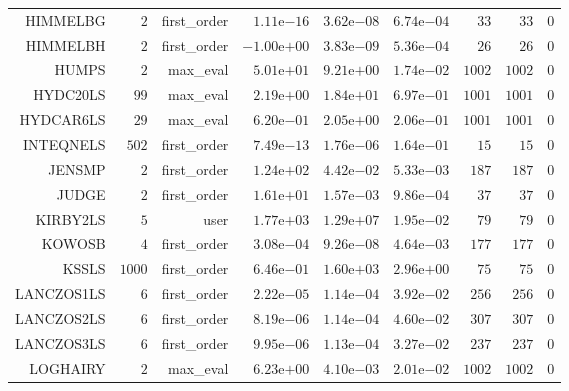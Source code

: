 \begin{longtable}{rrrrrrrrr}
HIMMELBG & \(     2\) & first\_order & \( 1.11\)e\(-16\) & \( 3.62\)e\(-08\) & \( 6.74\)e\(-04\) & \(    33\) & \(    33\) & \(     0\) \\
HIMMELBH & \(     2\) & first\_order & \(-1.00\)e\(+00\) & \( 3.83\)e\(-09\) & \( 5.36\)e\(-04\) & \(    26\) & \(    26\) & \(     0\) \\
HUMPS & \(     2\) & max\_eval & \( 5.01\)e\(+01\) & \( 9.21\)e\(+00\) & \( 1.74\)e\(-02\) & \(  1002\) & \(  1002\) & \(     0\) \\
HYDC20LS & \(    99\) & max\_eval & \( 2.19\)e\(+00\) & \( 1.84\)e\(+01\) & \( 6.97\)e\(-01\) & \(  1001\) & \(  1001\) & \(     0\) \\
HYDCAR6LS & \(    29\) & max\_eval & \( 6.20\)e\(-01\) & \( 2.05\)e\(+00\) & \( 2.06\)e\(-01\) & \(  1001\) & \(  1001\) & \(     0\) \\
INTEQNELS & \(   502\) & first\_order & \( 7.49\)e\(-13\) & \( 1.76\)e\(-06\) & \( 1.64\)e\(-01\) & \(    15\) & \(    15\) & \(     0\) \\
JENSMP & \(     2\) & first\_order & \( 1.24\)e\(+02\) & \( 4.42\)e\(-02\) & \( 5.33\)e\(-03\) & \(   187\) & \(   187\) & \(     0\) \\
JUDGE & \(     2\) & first\_order & \( 1.61\)e\(+01\) & \( 1.57\)e\(-03\) & \( 9.86\)e\(-04\) & \(    37\) & \(    37\) & \(     0\) \\
KIRBY2LS & \(     5\) & user & \( 1.77\)e\(+03\) & \( 1.29\)e\(+07\) & \( 1.95\)e\(-02\) & \(    79\) & \(    79\) & \(     0\) \\
KOWOSB & \(     4\) & first\_order & \( 3.08\)e\(-04\) & \( 9.26\)e\(-08\) & \( 4.64\)e\(-03\) & \(   177\) & \(   177\) & \(     0\) \\
KSSLS & \(  1000\) & first\_order & \( 6.46\)e\(-01\) & \( 1.60\)e\(+03\) & \( 2.96\)e\(+00\) & \(    75\) & \(    75\) & \(     0\) \\
LANCZOS1LS & \(     6\) & first\_order & \( 2.22\)e\(-05\) & \( 1.14\)e\(-04\) & \( 3.92\)e\(-02\) & \(   256\) & \(   256\) & \(     0\) \\
LANCZOS2LS & \(     6\) & first\_order & \( 8.19\)e\(-06\) & \( 1.14\)e\(-04\) & \( 4.60\)e\(-02\) & \(   307\) & \(   307\) & \(     0\) \\
LANCZOS3LS & \(     6\) & first\_order & \( 9.95\)e\(-06\) & \( 1.13\)e\(-04\) & \( 3.27\)e\(-02\) & \(   237\) & \(   237\) & \(     0\) \\
LOGHAIRY & \(     2\) & max\_eval & \( 6.23\)e\(+00\) & \( 4.10\)e\(-03\) & \( 2.01\)e\(-02\) & \(  1002\) & \(  1002\) & \(     0\) \\

\end{longtable}
